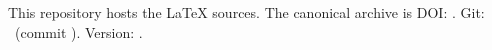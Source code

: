 This repository hosts the LaTeX sources.
The canonical archive is DOI: \RepoDOI.
Git: \RepoGitHubURL\ (commit \RepoCommit). Version: \PaperVersion.
